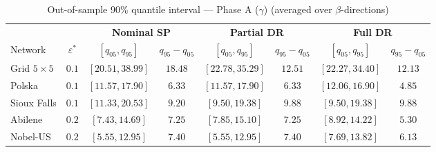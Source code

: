 \begin{table}[htbp]
\centering
\caption{Out-of-sample 90\% quantile interval — Phase A ($\gamma$) (averaged over $\beta$-directions)}
\label{tab:oos-gamma}
\small
\setlength{\tabcolsep}{6pt}
\begin{tabular}{l c cc cc cc}
\toprule
& & \multicolumn{2}{c}{\textbf{Nominal SP}} & \multicolumn{2}{c}{\textbf{Partial DR}} & \multicolumn{2}{c}{\textbf{Full DR}} \\
\cmidrule(lr){3-4} \cmidrule(lr){5-6} \cmidrule(lr){7-8}
Network & $\varepsilon^{*}$ & $[q_{05}, q_{95}]$ & $q_{95} \!-\! q_{05}$ & $[q_{05}, q_{95}]$ & $q_{95} \!-\! q_{05}$ & $[q_{05}, q_{95}]$ & $q_{95} \!-\! q_{05}$ \\
\midrule
Grid $5 \times 5$ & $0.1$ & $[20.51, 38.99]$ & $18.48$ & $[22.78, 35.29]$ & $12.51$ & $[22.27, \mathbf{34.40}]$ & $\mathbf{12.13}$ \\
Polska & $0.1$ & $[11.57, 17.90]$ & $6.33$ & $[11.57, 17.90]$ & $6.33$ & $[12.06, \mathbf{16.90}]$ & $\mathbf{4.85}$ \\
Sioux Falls & $0.1$ & $[11.33, 20.53]$ & $\mathbf{9.20}$ & $[9.50, \mathbf{19.38}]$ & $9.88$ & $[9.50, \mathbf{19.38}]$ & $9.88$ \\
Abilene & $0.2$ & $[7.43, 14.69]$ & $7.25$ & $[7.85, 15.10]$ & $7.25$ & $[8.92, \mathbf{14.22}]$ & $\mathbf{5.30}$ \\
Nobel-US & $0.2$ & $[5.55, \mathbf{12.95}]$ & $7.40$ & $[5.55, \mathbf{12.95}]$ & $7.40$ & $[7.69, 13.82]$ & $\mathbf{6.13}$ \\
\bottomrule
\end{tabular}
\end{table}


